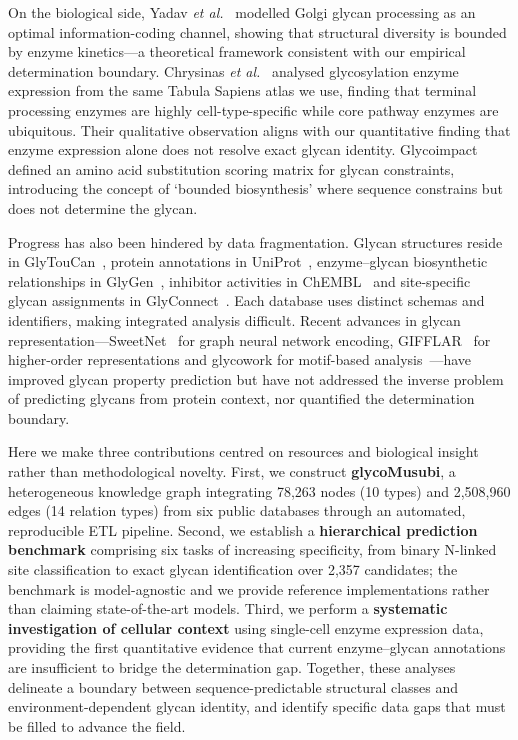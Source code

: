 \documentclass[11pt,a4paper]{article}
\begin{document}
On the biological side, Yadav \textit{et al.}~\cite{yadav2022} modelled Golgi
glycan processing as an optimal information-coding channel, showing that
structural diversity is bounded by enzyme kinetics---a theoretical framework
consistent with our empirical determination boundary.
Chrysinas \textit{et al.}~\cite{chrysinas2024} analysed glycosylation enzyme
expression from the same Tabula Sapiens atlas we use, finding that terminal
processing enzymes are highly cell-type-specific while core pathway enzymes are
ubiquitous. Their qualitative observation aligns with our quantitative finding
that enzyme expression alone does not resolve exact glycan identity.
Glycoimpact~\cite{glycoimpact2024} defined an amino acid substitution scoring
matrix for glycan constraints, introducing the concept of `bounded biosynthesis'
where sequence constrains but does not determine the glycan.

Progress has also been hindered by data fragmentation. Glycan structures reside
in GlyTouCan~\cite{tiemeyer2017}, protein annotations in
UniProt~\cite{uniprot2023}, enzyme--glycan biosynthetic relationships in
GlyGen~\cite{york2020}, inhibitor activities in ChEMBL~\cite{zdrazil2024} and
site-specific glycan assignments in GlyConnect~\cite{alocci2019}. Each database
uses distinct schemas and identifiers, making integrated analysis difficult.
Recent advances in glycan representation---SweetNet~\cite{burkholz2022} for graph
neural network encoding, GIFFLAR~\cite{thomes2024} for higher-order
representations and glycowork for motif-based analysis~\cite{thomes2021}---have
improved glycan property prediction but have not addressed the inverse problem of
predicting glycans from protein context, nor quantified the determination
boundary.

Here we make three contributions centred on resources and biological
insight rather than methodological novelty.  First, we construct
\textbf{glycoMusubi}, a heterogeneous knowledge graph integrating 78,263
nodes (10 types) and 2,508,960 edges (14 relation types) from six public
databases through an automated, reproducible ETL pipeline.  Second, we
establish a \textbf{hierarchical prediction benchmark} comprising six
tasks of increasing specificity, from binary N-linked site
classification to exact glycan identification over 2,357 candidates; the
benchmark is model-agnostic and we provide reference implementations
rather than claiming state-of-the-art models.  Third, we perform a
\textbf{systematic investigation of cellular context} using single-cell
enzyme expression data, providing the first quantitative evidence that
current enzyme--glycan annotations are insufficient to bridge the
determination gap. Together, these analyses delineate a boundary between
sequence-predictable structural classes and environment-dependent glycan
identity, and identify specific data gaps that must be filled to advance the
field.
\end{document}
